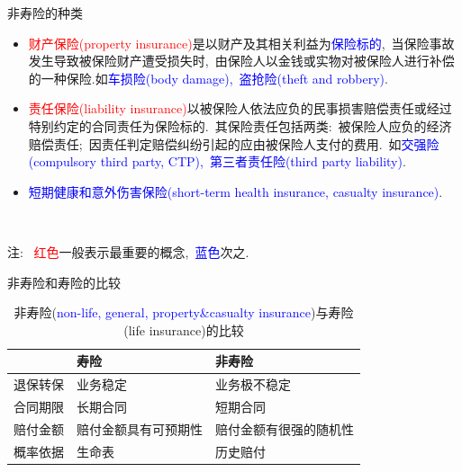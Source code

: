 \documentclass[professionalfont]{beamer}
\newcommand{\red}[1]{\textcolor{red}{#1}}
\newcommand{\blue}[1]{\textcolor{blue}{#1}}
\begin{document}
\begin{frame}{非寿险的种类}
	\begin{itemize}
		\item \red{财产保险(property insurance)}是以财产及其相关利益为\blue{保险标的},~当保险事故发生导致被保险财产遭受损失时,~由保险人以金钱或实物对被保险人进行补偿的一种保险.如\blue{车损险(body damage),~盗抢险(theft and robbery)}.
		\item \red{责任保险(liability insurance)}以被保险人依法应负的民事损害赔偿责任或经过特别约定的合同责任为保险标的.~其保险责任包括两类:~被保险人应负的经济赔偿责任;~因责任判定赔偿纠纷引起的应由被保险人支付的费用.~如\blue{交强险(compulsory third party, CTP),~第三者责任险(third party liability)}.
		\item \blue{短期健康和意外伤害保险(short-term health insurance, casualty insurance)}.
	\end{itemize}

~

注:~ \red{红色}一般表示最重要的概念,~\blue{蓝色}次之.
\end{frame}
\begin{frame}{非寿险和寿险的比较}
	\begin{table}[]
		\centering
		\caption{非寿险(\blue{non-life, general, property\&casualty insurance})与寿险(life insurance)的比较}
		\label{my-label}
		\begin{tabular}{lll}
			\hline
			& 寿险 & 非寿险 \\ \hline
			退保转保 & 业务稳定               & 业务极不稳定                                             \\
			合同期限 & 长期合同               & 短期合同                                               \\
			赔付金额 & 赔付金额具有可预期性         & 赔付金额有很强的随机性                                    \\
			概率依据 & 生命表                & 历史赔付                                               \\ \hline
		\end{tabular}
	\end{table}
\end{frame}
\end{document}

